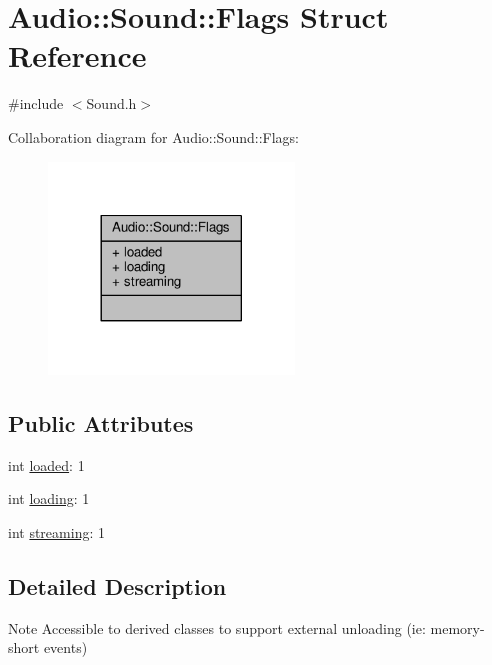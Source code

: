 \hypertarget{structAudio_1_1Sound_1_1Flags}{}\section{Audio\+:\+:Sound\+:\+:Flags Struct Reference}
\label{structAudio_1_1Sound_1_1Flags}


{\ttfamily \#include $<$Sound.\+h$>$}



Collaboration diagram for Audio\+:\+:Sound\+:\+:Flags\+:
\nopagebreak
\begin{figure}[H]
\begin{center}
\leavevmode
\includegraphics[width=185pt]{da/dc3/structAudio_1_1Sound_1_1Flags__coll__graph}
\end{center}
\end{figure}
\subsection*{Public Attributes}
\begin{DoxyCompactItemize}
\item 
int \hyperlink{structAudio_1_1Sound_1_1Flags_a983c6af241ce852ef7dc7aa28d007e86}{loaded}\+: 1
\item 
int \hyperlink{structAudio_1_1Sound_1_1Flags_aee2379eb089d1b1b0a5a59dc654d282e}{loading}\+: 1
\item 
int \hyperlink{structAudio_1_1Sound_1_1Flags_a21c89ac7107c98af17861a5fde0ad7f4}{streaming}\+: 1
\end{DoxyCompactItemize}


\subsection{Detailed Description}
\begin{DoxyNote}{Note}
Accessible to derived classes to support external unloading (ie\+: memory-\/short events) 
\end{DoxyNote}


